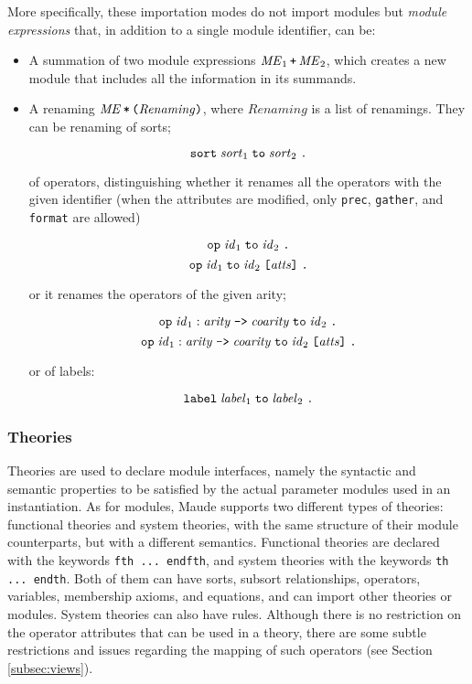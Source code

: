 More specifically, these importation modes do not import modules but
\emph{module expressions} that, in addition to a single module identifier,
can be:

\begin{itemize}
\item
A summation of two module expressions $\mathit{ME}_1 \,\verb"+"\,\mathit{ME}_2$,
which creates a new module that includes all the information in its summands.

\item
A renaming $\mathit{ME} \,\verb"*"\, \verb"("\mathit{Renaming}\verb")"$, where 
$\mathit{Renaming}$ is a list of renamings. They can be renaming of sorts;

$$
\verb"sort"\; \mathit{sort}_1\; \verb"to"\; \mathit{sort}_2\; \verb"."
$$

of operators, distinguishing whether it renames all the operators
with the given identifier (when the attributes are modified, only
\verb"prec", \verb"gather", and \verb"format" are allowed)

$$
\verb"op"\; \mathit{id}_1\; \verb"to"\; \mathit{id}_2\; \verb"."
$$
\vspace{-3ex}
$$
\verb"op"\; \mathit{id}_1\; \verb"to"\; \mathit{id}_2\; \verb"[" \mathit{atts} \verb"]"
\;  \verb"."
$$

\noindent or it renames the operators of the given arity;

$$
\verb"op"\; \mathit{id}_1 : \mathit{arity}\; \verb"->" \; \mathit{coarity}\;
\verb"to"\; \mathit{id}_2\; \verb"."
$$
\vspace{-3ex}
$$
\verb"op"\; \mathit{id}_1 : \mathit{arity}\; \verb"->" \; \mathit{coarity}\;
\verb"to"\; \mathit{id}_2\; \verb"[" \mathit{atts} \verb"]" \; \verb"."
$$

or of labels:

$$
\verb"label"\; \mathit{label}_1\; \verb"to"\; \mathit{label}_2\; \verb"."
$$

\end{itemize}

\subsubsection{Theories}\label{subsec:theories}

Theories are used to declare module interfaces, namely the syntactic
and semantic properties to be satisfied by the actual parameter modules
used in an instantiation. As for modules, Maude supports two different types
of theories: functional theories and system theories, with the same structure
of their module counterparts, but with a different semantics. Functional
theories  are declared with the keywords \verb"fth ... endfth", and
system theories with the keywords \verb"th ... endth". Both of them can
have sorts, subsort relationships, operators, variables, membership axioms,
and equations, and can import other theories or modules. System theories can
also have rules. Although there is no restriction on the operator attributes
that can be used in a theory, there are some subtle restrictions and
issues regarding the mapping of such operators (see Section
\ref{subsec:views}).

